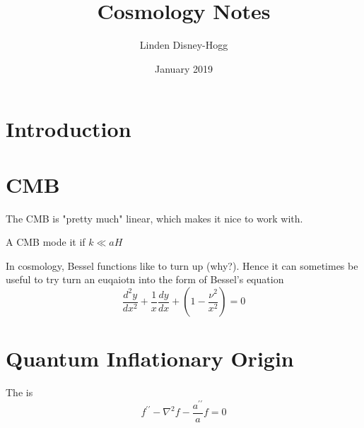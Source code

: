 \documentclass{article}
\title{Cosmology Notes}
\author{Linden Disney-Hogg}
\date{January 2019}
\begin{document}
\maketitle
\tableofcontents

\section{Introduction}



\section{CMB}
\begin{idea}
The CMB is "pretty much" linear, which makes it nice to work with. 
\end{idea}


\begin{definition}[Superhorizon]
A CMB mode it  if $k\ll aH$
\end{definition}


\begin{remark}
In cosmology, Bessel functions like to turn up (why?). Hence it can sometimes be useful to try turn an euqaiotn into the form of Bessel's equation 
\[
\frac{d^2y}{dx^2} + \frac{1}{x} \frac{dy}{dx} + \left( 1-\frac{\nu^2}{x^2} \right ) = 0 
\]
\end{remark}



\section{Quantum Inflationary Origin}

\begin{definition}
The  is 
\[
f ^ { \prime \prime } - \nabla ^ { 2 } f - \frac { a ^ { \prime \prime } } { a } f = 0
\]
\end{definition}
\end{document}
